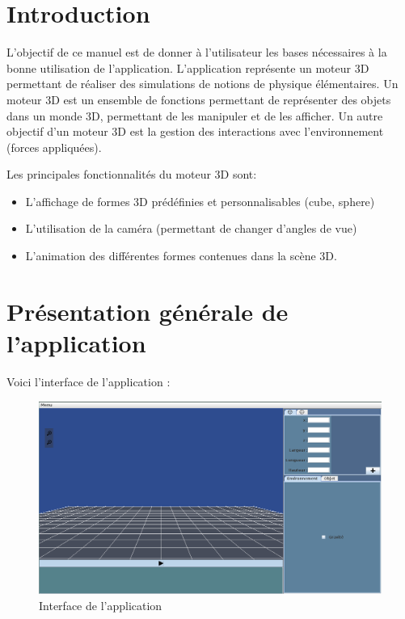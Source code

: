 \documentclass[11pt]{report}
\begin{document}


\tableofcontents

\chapter{Introduction}
L'objectif de ce manuel est de donner à l'utilisateur les bases nécessaires à la bonne utilisation de l'application.
L'application représente un moteur 3D permettant de réaliser des simulations de notions de physique élémentaires.
Un moteur 3D est un ensemble de fonctions permettant de représenter des objets dans un monde 3D, permettant de les
manipuler et de les afficher. Un autre objectif d'un moteur 3D est la gestion des interactions avec l'environnement (forces appliquées). \newline \newline


Les principales fonctionnalités du moteur 3D sont:
\begin{itemize}
        \item L'affichage de formes 3D prédéfinies et personnalisables (cube, sphere)
        \item L'utilisation de la caméra (permettant de changer d'angles de vue)
        \item L'animation des différentes formes contenues dans la scène 3D.
\end{itemize}

\chapter{Présentation générale de l'application}

Voici l'interface de l'application :

\begin{figure}[h]
  \centering
  \includegraphics[scale=0.4]{./interface.png}
  \caption{Interface de l'application}
\end{figure}
\end{document}
